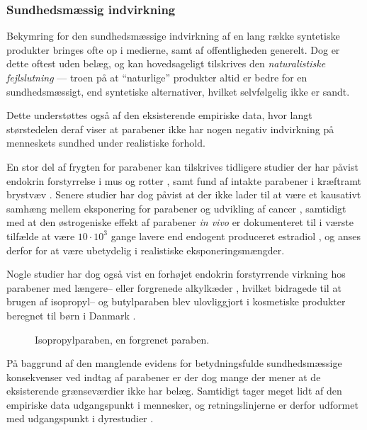     \subsubsection{Sundhedsmæssig indvirkning}
    Bekymring for den sundhedsmæssige indvirkning af en lang række syntetiske produkter bringes ofte op i medierne, samt af offentligheden generelt. Dog er dette oftest uden belæg, og kan hovedsageligt tilskrives den \textit{naturalistiske fejlslutning} \parencite{Paul2007} --- troen på at ``naturlige'' produkter altid er bedre for en sundhedsmæssigt, end syntetiske alternativer, hvilket selvfølgelig ikke er sandt.

    Dette understøttes også af den eksisterende empiriske data, hvor langt størstedelen deraf viser at parabener ikke har nogen negativ indvirkning på menneskets sundhed under realistiske forhold.

    En stor del af frygten for parabener kan tilskrives tidligere studier der har påvist endokrin forstyrrelse i mus og rotter \parencite{Phil2008}, samt fund af intakte parabener i kræftramt brystvæv \parencite{Darb2004}. Senere studier har dog påvist at der ikke lader til at være et kausativt samhæng mellem eksponering for parabener og udvikling af cancer \parencite{Emil2022}, samtidigt med at den østrogeniske effekt af parabener \textit{in vivo} er dokumenteret til i værste tilfælde at være $10\cdot 10^3$ gange lavere end endogent produceret estradiol \parencite{Edwi1998}, og anses derfor for at være ubetydelig i realistiske eksponeringsmængder.

    Nogle studier har dog også vist en forhøjet endokrin forstyrrende virkning hos parabener med længere-- eller forgrenede alkylkæder \parencite{Ebru2013}, hvilket bidragede til at brugen af isopropyl-- og butylparaben blev ulovliggjort i kosmetiske produkter beregnet til børn i Danmark \parencite{Milj2013}.
    \begin{figure}[H]\centering
        \caption{Isopropylparaben, en forgrenet paraben.}
    \end{figure}
    På baggrund af den manglende evidens for betydningsfulde sundhedsmæssige konsekvenser ved indtag af parabener er der dog mange der mener at de eksisterende grænseværdier \parencite{Euro2011} ikke har belæg. Samtidigt tager meget lidt af den empiriske data udgangspunkt i mennesker, og retningslinjerne er derfor udformet med udgangspunkt i dyrestudier \parencite{Emma2016}.

